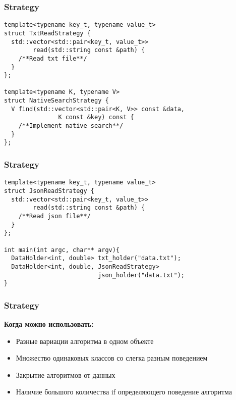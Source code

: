 \begin{frame}[fragile]
  \frametitle{Strategy}
  \begin{verbatim}
template<typename key_t, typename value_t>
struct TxtReadStrategy {
  std::vector<std::pair<key_t, value_t>> 
        read(std::string const &path) {
    /**Read txt file**/
  }
};

template<typename K, typename V>
struct NativeSearchStrategy {
  V find(std::vector<std::pair<K, V>> const &data, 
               K const &key) const {
    /**Implement native search**/
  }
};
  \end{verbatim} 
\end{frame}

\begin{frame}[fragile]
  \frametitle{Strategy}
  \begin{verbatim}
template<typename key_t, typename value_t>
struct JsonReadStrategy {
  std::vector<std::pair<key_t, value_t>> 
        read(std::string const &path) {
    /**Read json file**/
  }
};

int main(int argc, char** argv){
  DataHolder<int, double> txt_holder("data.txt");
  DataHolder<int, double, JsonReadStrategy> 
                          json_holder("data.txt");
}
  \end{verbatim} 
\end{frame}

\begin{frame}
  \frametitle{Strategy}
  \textbf{Когда можно использовать:}
  \begin{itemize}
    \item Разные вариации алгоритма в одном объекте
    \item Множество одинаковых классов со слегка разным поведением
    \item Закрытие алгоритмов от данных
    \item Наличие большого количества if определяющего поведение алгоритма
  \end{itemize}
\end{frame}

